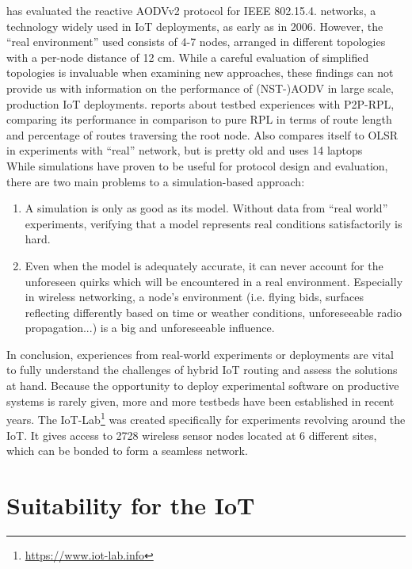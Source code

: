 \documentclass[a4paper,10pt]{scrartcl}
\begin{document}
\cite{gomez_NSTAODV_eval} has evaluated the reactive AODVv2 protocol for IEEE 802.15.4. networks, a technology widely used in IoT deployments, as early as in 2006. However, the ``real environment'' used consists of 4-7 nodes, arranged in different topologies with a per-node distance of 12 cm. While a careful evaluation of simplified topologies is invaluable when examining new approaches, these findings can not provide us with information on the performance of (NST-)AODV in large scale, production IoT deployments.
\cite{baccelli_p2p_prl} reports about testbed experiences with P2P-RPL, comparing its performance in comparison to pure RPL in terms of route length and percentage of routes traversing the root node.
\cite{WARP} Also compares itself to OLSR in experiments with ``real'' network, but is pretty old and uses 14 laptops \\

While simulations have proven to be useful for protocol design and evaluation, there are two main problems to a simulation-based approach: 
\begin{enumerate}
\item A simulation is only as good as its model. Without data from ``real world'' experiments, verifying that a model represents real conditions satisfactorily is hard.
\item Even when the model is adequately accurate, it can never account for the unforeseen quirks which will be encountered in a real environment. Especially in wireless networking, a node's environment (i.e. flying bids, surfaces reflecting differently based on time or weather conditions, unforeseeable radio propagation...) is a big and unforeseeable influence.
\end{enumerate}
In conclusion, experiences from real-world experiments or deployments are vital to fully understand the challenges of hybrid IoT routing and assess the solutions at hand. Because the opportunity to deploy experimental software on productive systems is rarely given, more and more testbeds have been established in recent years. 
The IoT-Lab\footnote{\url{https://www.iot-lab.info}} was created specifically for experiments revolving around the IoT. It gives access to 2728 wireless sensor nodes located at 6 different sites, which can be bonded to form a seamless network.

\section{Suitability for the IoT}
\label{sec:suitability}
\end{document}
